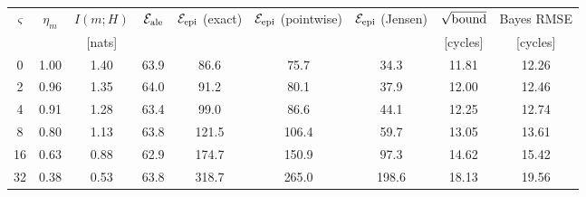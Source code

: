 
\begin{tabular}{c c c c c c c c c}
\hline
$\varsigma$ & $\eta_m$ & $I(m;H)$ & $\mathcal{E}_{\rm ale}$ & $\mathcal{E}_{\rm epi}$ (exact) & $\mathcal{E}_{\rm epi}$ (pointwise) & $\mathcal{E}_{\rm epi}$ (Jensen) & $\sqrt{\rm bound}$ & Bayes RMSE \\
 & & [nats] & & & & & [cycles] & [cycles] \\
\hline
0 & 1.00 & 1.40 & 63.9 & 86.6 & 75.7 & 34.3 & 11.81 & 12.26 \\
2 & 0.96 & 1.35 & 64.0 & 91.2 & 80.1 & 37.9 & 12.00 & 12.46 \\
4 & 0.91 & 1.28 & 63.4 & 99.0 & 86.6 & 44.1 & 12.25 & 12.74 \\
8 & 0.80 & 1.13 & 63.8 & 121.5 & 106.4 & 59.7 & 13.05 & 13.61 \\
16 & 0.63 & 0.88 & 62.9 & 174.7 & 150.9 & 97.3 & 14.62 & 15.42 \\
32 & 0.38 & 0.53 & 63.8 & 318.7 & 265.0 & 198.6 & 18.13 & 19.56 \\
\hline
\end{tabular}
